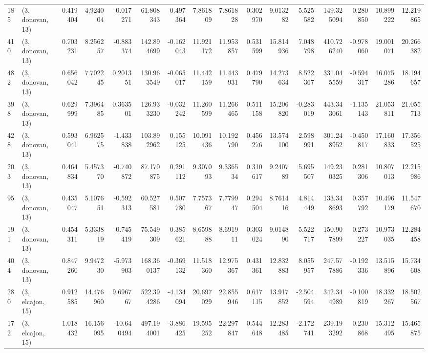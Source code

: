 \begin{tabular}{llrrrrrrrrrrrrrr}
185 &  (3, donovan, 13) &   0.419404 &   4.924004 &  -0.017271 &    61.808343 &   0.497364 &   7.861809 &   7.861828 &  0.302970 &   9.013282 &   5.525582 &   149.325094 &  0.280850 &  10.899222 &  12.219865 \\
410 &  (3, donovan, 13) &   0.703231 &   8.256257 &  -0.883374 &   142.894699 &  -0.162043 &  11.921172 &  11.953857 &  0.531599 &  15.814936 &   7.048798 &   410.726240 & -0.978060 &  19.001071 &  20.266382 \\
482 &  (3, donovan, 13) &   0.656042 &   7.702245 &   0.201351 &   130.963549 &  -0.065017 &  11.442159 &  11.443931 &  0.479790 &  14.273634 &   8.522367 &   331.045559 & -0.594317 &  16.075286 &  18.194657 \\
398 &  (3, donovan, 13) &   0.629999 &   7.396485 &   0.363501 &   126.933230 &  -0.032242 &  11.260599 &  11.266465 &  0.511158 &  15.206820 &  -0.283019 &   443.343061 & -1.135143 &  21.053811 &  21.055713 \\
428 &  (3, donovan, 13) &   0.593041 &   6.962575 &  -1.433838 &   103.892962 &   0.155125 &  10.091436 &  10.192790 &  0.456276 &  13.574100 &   2.598991 &   301.248952 & -0.450817 &  17.160833 &  17.356525 \\
203 &  (3, donovan, 13) &   0.464834 &   5.457370 &  -0.740872 &    87.170875 &   0.291112 &   9.307093 &   9.336534 &  0.310617 &   9.240789 &   5.695507 &   149.230325 &  0.281306 &  10.807013 &  12.215986 \\
95  &  (3, donovan, 13) &   0.435047 &   5.107651 &  -0.592313 &    60.527581 &   0.507780 &   7.757367 &   7.779947 &  0.294504 &   8.761416 &   4.814449 &   133.348693 &  0.357792 &  10.496179 &  11.547670 \\
191 &  (3, donovan, 13) &   0.454311 &   5.333819 &  -0.745419 &    75.549309 &   0.385621 &   8.659888 &   8.691911 &  0.303024 &   9.014890 &   5.522717 &   150.907899 &  0.273227 &  10.973035 &  12.284458 \\
404 &  (3, donovan, 13) &   0.847260 &   9.947230 &  -5.973903 &   168.360137 &  -0.369132 &  11.518360 &  12.975367 &  0.431361 &  12.832883 &   8.055957 &   247.577886 & -0.192336 &  13.515896 &  15.734608 \\
280 &  (3, elcajon, 15) &   0.912585 &  14.476960 &   9.696767 &   522.394286 &  -4.134094 &  20.697029 &  22.855946 &  0.617115 &  13.917852 &  -2.504594 &   342.344989 & -0.100819 &  18.332267 &  18.502567 \\
172 &  (3, elcajon, 15) &   1.018432 &  16.156095 & -10.640494 &   497.194001 &  -3.886425 &  19.595252 &  22.297847 &  0.544648 &  12.283485 &  -2.172741 &   239.193292 &  0.230868 &  15.312495 &  15.465875 \\

\end{tabular}
